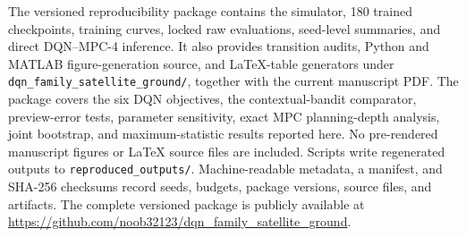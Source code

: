 \documentclass[11pt]{article}
\begin{document}
The versioned reproducibility package contains the simulator, 180 trained checkpoints, training curves, locked raw evaluations, seed-level summaries, and direct DQN--MPC-4 inference. It also provides transition audits, Python and MATLAB figure-generation source, and LaTeX-table generators under \texttt{dqn\_family\_satellite\_ground/}, together with the current manuscript PDF. The package covers the six DQN objectives, the contextual-bandit comparator, preview-error tests, parameter sensitivity, exact MPC planning-depth analysis, joint bootstrap, and maximum-statistic results reported here. No pre-rendered manuscript figures or LaTeX source files are included. Scripts write regenerated outputs to \texttt{reproduced\_outputs/}. Machine-readable metadata, a manifest, and SHA-256 checksums record seeds, budgets, package versions, source files, and artifacts. The complete versioned package is publicly available at \url{https://github.com/noob32123/dqn_family_satellite_ground}.

\begingroup
\small
\setlength{\itemsep}{0.2em}


\endgroup
\end{document}
